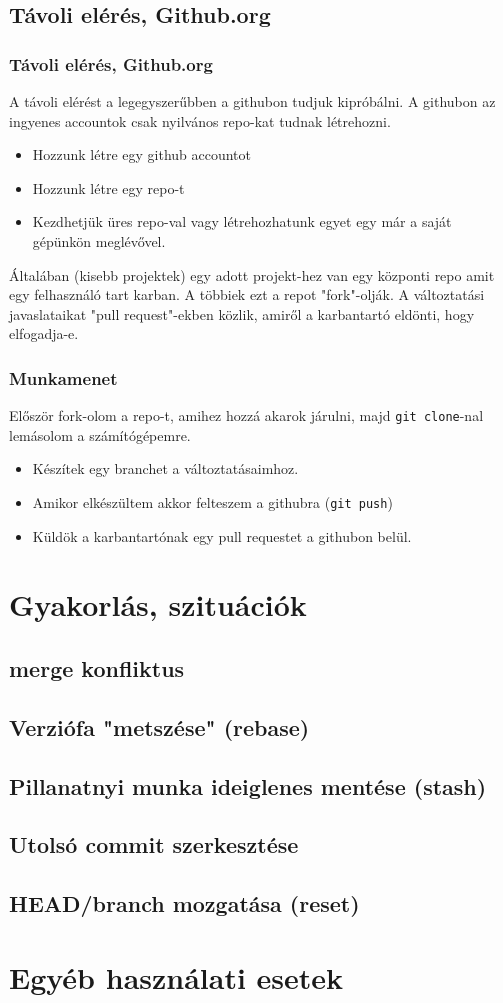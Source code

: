 	\subsection{Távoli elérés, Github.org}
	\begin{frame}
	  \frametitle{Távoli elérés, Github.org}
	  A távoli elérést a legegyszerűbben a githubon tudjuk kipróbálni.
	  A githubon az ingyenes accountok csak nyilvános repo-kat tudnak létrehozni.
	  \begin{itemize}
	    \item Hozzunk létre egy github accountot
	    \item Hozzunk létre egy repo-t
	    \item Kezdhetjük üres repo-val vagy létrehozhatunk egyet egy már a saját gépünkön meglévővel.
	  \end{itemize}
	  Általában (kisebb projektek) egy adott projekt-hez van egy központi repo amit egy felhasználó tart karban.
	  A többiek ezt a repot "fork"-olják.
	  A változtatási javaslataikat "pull request"-ekben közlik, amiről a karbantartó eldönti, hogy elfogadja-e.
	\end{frame}
	\begin{frame}
	  \frametitle{Munkamenet}
	  Először fork-olom a repo-t, amihez hozzá akarok járulni, majd \lstinline+git clone+-nal lemásolom a számítógépemre.
	  
	  \begin{itemize}
	    \item Készítek egy branchet a változtatásaimhoz.
	    \item Amikor elkészültem akkor felteszem a githubra (\lstinline+git push+)
	    \item Küldök a karbantartónak egy pull requestet a githubon belül.
	  \end{itemize}
	\end{frame}

\section{Gyakorlás, szituációk}
	\subsection{merge konfliktus}
	\subsection{Verziófa "metszése" (rebase)}
	\subsection{Pillanatnyi munka ideiglenes mentése (stash)}
	\subsection{Utolsó commit szerkesztése}
	\subsection{HEAD/branch mozgatása (reset)}

\section{Egyéb használati esetek}



